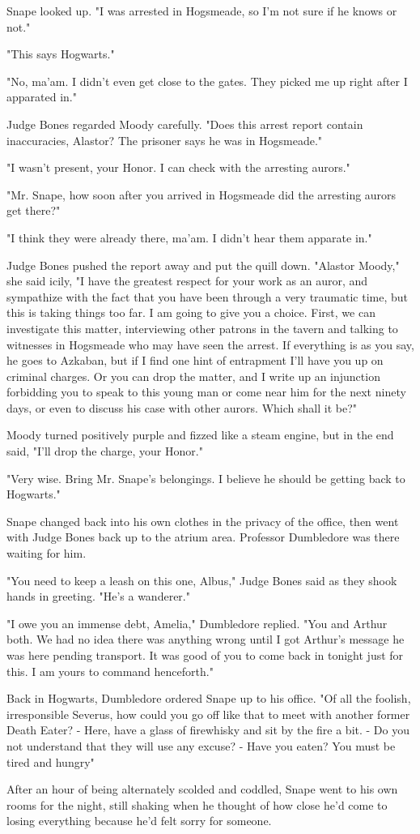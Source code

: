 Snape looked up. "I was arrested in Hogsmeade, so I'm not sure if he knows or not."

"This says Hogwarts."

"No, ma'am. I didn't even get close to the gates. They picked me up right after I apparated in."

Judge Bones regarded Moody carefully. "Does this arrest report contain inaccuracies, Alastor? The prisoner says he was in Hogsmeade."

"I wasn't present, your Honor. I can check with the arresting aurors."

"Mr. Snape, how soon after you arrived in Hogsmeade did the arresting aurors get there?"

"I think they were already there, ma'am. I didn't hear them apparate in."

Judge Bones pushed the report away and put the quill down. "Alastor Moody," she said icily, "I have the greatest respect for your work as an auror, and sympathize with the fact that you have been through a very traumatic time, but this is taking things too far. I am going to give you a choice. First, we can investigate this matter, interviewing other patrons in the tavern and talking to witnesses in Hogsmeade who may have seen the arrest. If everything is as you say, he goes to Azkaban, but if I find one hint of entrapment I'll have you up on criminal charges. Or you can drop the matter, and I write up an injunction forbidding you to speak to this young man or come near him for the next ninety days, or even to discuss his case with other aurors. Which shall it be?"

Moody turned positively purple and fizzed like a steam engine, but in the end said, "I'll drop the charge, your Honor."

"Very wise. Bring Mr. Snape's belongings. I believe he should be getting back to Hogwarts."

Snape changed back into his own clothes in the privacy of the office, then went with Judge Bones back up to the atrium area. Professor Dumbledore was there waiting for him.

"You need to keep a leash on this one, Albus," Judge Bones said as they shook hands in greeting. "He's a wanderer."

"I owe you an immense debt, Amelia," Dumbledore replied. "You and Arthur both. We had no idea there was anything wrong until I got Arthur's message he was here pending transport. It was good of you to come back in tonight just for this. I am yours to command henceforth."

Back in Hogwarts, Dumbledore ordered Snape up to his office. "Of all the foolish, irresponsible{\el} Severus, how could you go off like that to meet with another former Death Eater? - Here, have a glass of firewhisky and sit by the fire a bit. - Do you not understand that they will use any excuse{\el}? - Have you eaten? You must be tired and hungry{\el}"

After an hour of being alternately scolded and coddled, Snape went to his own rooms for the night, still shaking when he thought of how close he'd come to losing everything because he'd felt sorry for someone. 



